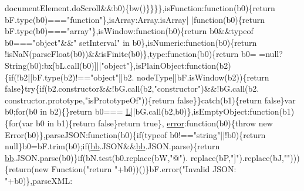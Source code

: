 \begin{DoxyCode}
      documentElement.doScroll&&b0)\{bw()\}\}\}\},isFunction:\textcolor{keyword}{function}(b0)\{\textcolor{keywordflow}{return} bF.type(b0)===\textcolor{stringliteral}{"function"}\},isArray:Array.isArray|
      |\textcolor{keyword}{function}(b0)\{\textcolor{keywordflow}{return} bF.type(b0)===\textcolor{stringliteral}{"array"}\},isWindow:\textcolor{keyword}{function}(b0)\{\textcolor{keywordflow}{return} b0&&typeof b0===\textcolor{stringliteral}{"object"}&&\textcolor{stringliteral}{"
      setInterval"} in b0\},isNumeric:\textcolor{keyword}{function}(b0)\{\textcolor{keywordflow}{return} !isNaN(parseFloat(b0))&&isFinite(b0)\},type:\textcolor{keyword}{function}(b0)\{\textcolor{keywordflow}{return} b0=
      =null?String(b0):bx[bL.call(b0)]||\textcolor{stringliteral}{"object"}\},isPlainObject:\textcolor{keyword}{function}(b2)\{\textcolor{keywordflow}{if}(!b2||bF.type(b2)!==\textcolor{stringliteral}{"object"}||b2.
      nodeType||bF.isWindow(b2))\{\textcolor{keywordflow}{return} \textcolor{keyword}{false}\}\textcolor{keywordflow}{try}\{\textcolor{keywordflow}{if}(b2.constructor&&!bG.call(b2,\textcolor{stringliteral}{"constructor"})&&!bG.call(b2.
      constructor.prototype,\textcolor{stringliteral}{"isPrototypeOf"}))\{\textcolor{keywordflow}{return} \textcolor{keyword}{false}\}\}\textcolor{keywordflow}{catch}(b1)\{\textcolor{keywordflow}{return} \textcolor{keyword}{false}\}var b0;\textcolor{keywordflow}{for}(b0 in b2)\{\}\textcolor{keywordflow}{return} b0===
      \hyperlink{jquery_8js_a38ee4c0b5f4fe2a18d0c783af540d253}{L}||bG.call(b2,b0)\},isEmptyObject:\textcolor{keyword}{function}(b1)\{\textcolor{keywordflow}{for}(var b0 in b1)\{\textcolor{keywordflow}{return} \textcolor{keyword}{false}\}\textcolor{keywordflow}{return} \textcolor{keyword}{true}\},
      \hyperlink{_i2_c_8c_ad1a5ba420409525ff5ab1be86ac5e526}{error}:\textcolor{keyword}{function}(b0)\{\textcolor{keywordflow}{throw} \textcolor{keyword}{new} Error(b0)\},parseJSON:\textcolor{keyword}{function}(b0)\{\textcolor{keywordflow}{if}(typeof b0!==\textcolor{stringliteral}{"string"}||!b0)\{\textcolor{keywordflow}{return} 
      null\}b0=bF.trim(b0);\textcolor{keywordflow}{if}(\hyperlink{jquery_8js_a1d6558865876e1c8cca029fce41a4bdb}{bb}.JSON&&\hyperlink{jquery_8js_a1d6558865876e1c8cca029fce41a4bdb}{bb}.JSON.parse)\{\textcolor{keywordflow}{return} \hyperlink{jquery_8js_a1d6558865876e1c8cca029fce41a4bdb}{bb}.JSON.parse(b0)\}\textcolor{keywordflow}{if}(bN.test(b0.replace(bW,\textcolor{stringliteral}{"@"}).
      replace(bP,\textcolor{stringliteral}{"]"}).replace(bJ,\textcolor{stringliteral}{""})))\{\textcolor{keywordflow}{return}(\textcolor{keyword}{new} Function(\textcolor{stringliteral}{"return "}+b0))()\}bF.error(\textcolor{stringliteral}{"Invalid JSON: "}+b0)\},parseXML:\textcolor{keyword}{
}
\end{DoxyCode}
